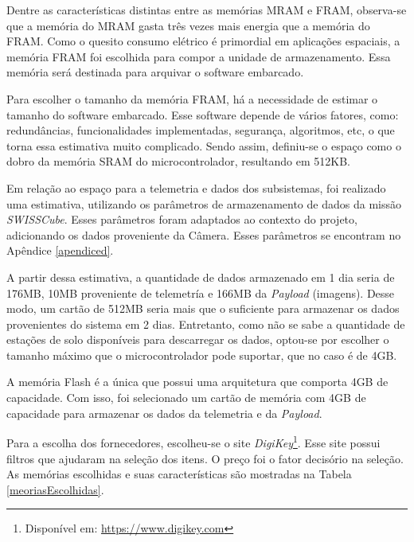 Dentre as características distintas entre as memórias MRAM e FRAM, observa-se que a memória do MRAM gasta três vezes mais energia que a memória do FRAM. Como o quesito consumo elétrico é primordial em aplicações espaciais, a memória FRAM foi escolhida para compor a unidade de armazenamento. Essa memória será destinada para arquivar o software embarcado.

Para escolher o tamanho da memória FRAM, há a necessidade de estimar o tamanho do software embarcado. Esse software depende de vários fatores, como: redundâncias, funcionalidades implementadas, segurança, algoritmos, etc, o que torna essa estimativa muito complicado. Sendo assim, definiu-se o espaço como o dobro da memória SRAM do microcontrolador,  resultando em 512KB.

Em relação ao espaço para a telemetria e dados dos subsistemas, foi realizado uma estimativa, utilizando os parâmetros de armazenamento de dados da missão \textit{SWISSCube}. Esses parâmetros foram adaptados ao contexto do projeto, adicionando os dados proveniente da Câmera. Esses parâmetros se encontram no Apêndice \ref{apendiced}.

A partir dessa estimativa, a quantidade de dados armazenado em 1 dia seria de 176MB, 10MB proveniente de telemetría e 166MB da \textit{Payload} (imagens). Desse modo, um cartão de 512MB seria mais que o suficiente para armazenar os dados provenientes do sistema em 2 dias. Entretanto, como não se sabe a quantidade de estações de solo disponíveis para descarregar os dados, optou-se por escolher o tamanho máximo que o microcontrolador pode suportar, que no caso é de 4GB.

A memória Flash é a única que possui uma arquitetura que comporta 4GB de capacidade. Com isso, foi selecionado um cartão de memória com 4GB de capacidade para armazenar os dados da telemetria e da \textit{Payload}. 

Para a escolha dos fornecedores, escolheu-se o site \textit{DigiKey}\footnote{Disponível em: \url{https://www.digikey.com}}. Esse site possui filtros que ajudaram na seleção dos itens. O preço foi o fator decisório na seleção. As memórias escolhidas e suas características são mostradas na Tabela \ref{meoriasEscolhidas}.

\begin{table}[h]
\centering
\caption{Especificação das memórias da Unidade de Armazenamento.}
\label{meoriasEscolhidas}
\end{table}

